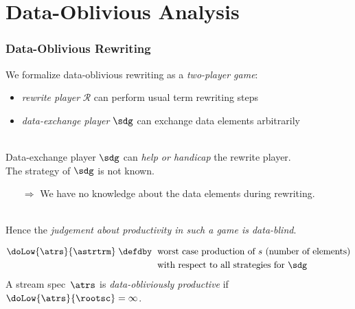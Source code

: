 \documentclass[10pt]{beamer}
\begin{document}
\section[D-O Analysis]{Data-Oblivious Analysis}


\begin{frame}%
  \frametitle{Data-Oblivious Rewriting}

We formalize data-oblivious rewriting as a \emph{two-player game}:
%
\begin{itemize}
  \item \emph{rewrite player} $\mathcal{R}$ 
    can perform usual term rewriting steps
  \item \emph{data-exchange player} $\sdg$ can exchange 
        data elements arbitrarily
\end{itemize}\ \\[1ex]

Data-exchange player $\sdg$ can \emph{help or handicap} the rewrite player.\\[1ex]

The strategy of $\sdg$ is not known.
\begin{itemize}
 \item [$\Rightarrow$] We have no knowledge about the data elements during rewriting.
\end{itemize}\ \\[1ex]

Hence the \emph{judgement about productivity in such a game is data-blind}.

\begin{definition}
  \vspace{-2.5ex}
  \begin{align*}
    \doLow{\atrs}{\astrtrm} \;\defdby\;\ &\text{worst case production of $s$ (number of elements)}\\
                                         &\text{with respect to all strategies for $\sdg$}
  \end{align*}
  A stream spec~$\atrs$ is \emph{data-obliviously productive} if $\doLow{\atrs}{\rootsc} = \infty$.
\end{definition}

\end{frame}%
\end{document}

